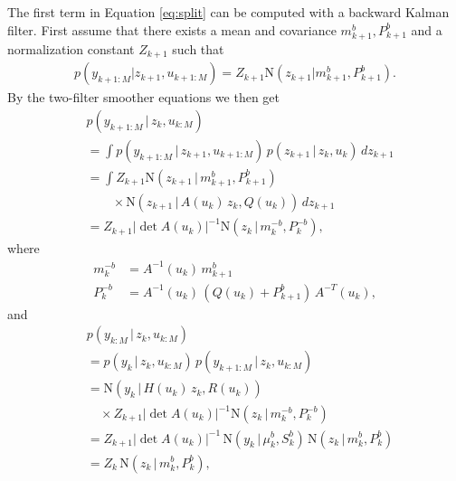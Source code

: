 \documentclass[twocolumn]{autart}    %
\begin{document}
%
The first term in Equation \eqref{eq:split} can be computed with a
backward Kalman filter. First assume
that there exists a mean and covariance $m^{b}_{k+1},P^{b}_{k+1}$ and a
normalization constant $Z_{k+1}$ such that
%
\begin{equation}
\begin{split}
  p(y_{k+1:M} | z_{k+1},u_{k+1:M})
  = Z_{k+1} \mathrm{N}(z_{k+1} | m^{b}_{k+1}, P^{b}_{k+1}).
\end{split}
\label{eq:normconst}
\end{equation}
%
By the two-filter smoother equations we then get
%
\begin{equation}
\begin{split}
  &p(y_{k+1:M} \,|\, z_{k},u_{k:M}) \\
  &=
  \int
  p(y_{k+1:M} \,|\, z_{k+1},u_{k+1:M}) \,
  p(z_{k+1} \,|\, z_{k},u_{k}) \, dz_{k+1} \\
  &= \int
  Z_{k+1} \mathrm{N}(z_{k+1} \,|\, m^{b}_{k+1}, P^{b}_{k+1}) \\
  &\qquad \times \mathrm{N}(z_{k+1} \,|\,A(u_k) \, z_k, Q(u_k)) \, dz_{k+1} \\
  &=
  Z_{k+1} |\det A(u_k)|^{-1}
  \mathrm{N}(z_{k} \,|\, m^{-b}_{k}, P^{-b}_{k}),
\end{split}
\end{equation}
%
where
%
\begin{equation}
\begin{split}
   m^{-b}_k &= A^{-1}(u_k) \, m^b_{k+1} \\
   P^{-b}_k &= A^{-1}(u_k) \, (Q(u_k) + P^b_{k+1}) \, A^{-T}(u_k),
\end{split}
\label{eq:bkf_predict}
\end{equation}
%
and
%
\begin{equation}
\begin{split}
  &p(y_{k:M} \,|\, z_{k},u_{k:M}) \\
  &= p(y_{k} \,|\, z_{k},u_{k:M}) \, p(y_{k+1:M} \,|\, z_{k},u_{k:M}) \\
  &= \mathrm{N}(y_{k} \,|\, H(u_k) \, z_k, R(u_k)) \\
  &\quad \times Z_{k+1} |\det A(u_k)|^{-1}
  \mathrm{N}(z_{k} \,|\, m^{-b}_{k}, P^{-b}_{k}) \\
  &= Z_{k+1} |\det A(u_k)|^{-1} \, \mathrm{N}(y_{k} \,|\, \mu^b_k, S^b_k) \,
     \mathrm{N}(z_{k} \,|\, m^{b}_{k}, P^{b}_{k}) \\
  &= Z_{k} \,
     \mathrm{N}(z_{k} \,|\, m^{b}_{k}, P^{b}_{k}),
\end{split}
\end{equation}
\end{document}
